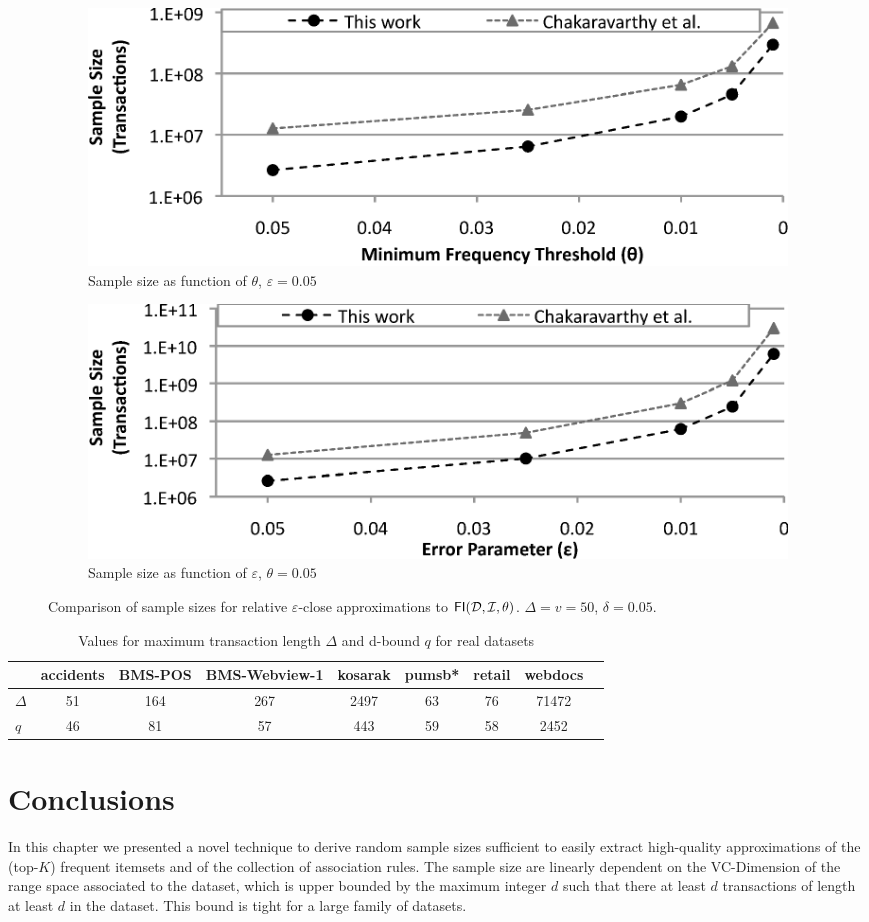 \begin{figure}[htb]
  \centering
  \begin{subfigure}[b]{\linewidth}
    \centering
    \includegraphics[width=0.75\linewidth]{vcmine/Fig5a}
    \caption{Sample size as function of $\theta$, $\varepsilon=0.05$}
     \label{fig:compareSamSizeTheta}
   \end{subfigure}

  \begin{subfigure}[b]{\linewidth}
    \centering
    \includegraphics[width=0.75\linewidth]{vcmine/Fig5b}
    \caption{Sample size as function of $\varepsilon$, $\theta=0.05$}
    \label{fig:compareSamSizeEpsilon}
  \end{subfigure}
  \caption{Comparison of sample sizes for relative $\varepsilon$-close approximations to
  $\mathsf{FI}({\cal D},{\cal I},\theta)$. $\Delta=v=50$, $\delta=0.05$.}
  \label{fig:compareSamSize}
\end{figure}

\begin{table}[hbt]
\centering
\caption{Values for maximum transaction length $\Delta$ and d-bound $q$ for real datasets}
\label{tab:deltadrealds}

\begin{tabular}{lcccccccc}
  \toprule
  & accidents & BMS-POS & BMS-Webview-1 & kosarak & pumsb* & retail & webdocs \\
  \midrule
  $\Delta$ & 51 & 164 & 267 & 2497 & 63 & 76 & 71472 \\
  $q$ & 46 & 81 & 57 & 443 & 59 & 58 & 2452 \\ 
  \bottomrule
\end{tabular}
\end{table}

\section{Conclusions}\label{sec:vcmineconcl}
In this chapter we presented a novel technique to derive random sample sizes
sufficient to easily extract high-quality approximations of the (top-$K$)
frequent itemsets and of the collection of association rules. The sample size
are linearly dependent on the VC-Dimension of the range space associated to the
dataset, which is upper bounded by the maximum integer $d$ such
that there at least $d$ transactions of length at least $d$ in the dataset. This 
bound is tight for a large family of datasets.  

